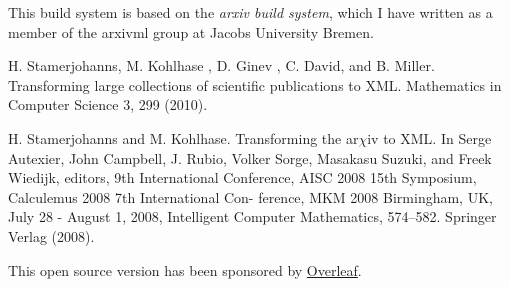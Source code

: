 \documentclass[a4paper]{article}
\begin{document}
This build system is based on the \textit{arxiv build system}, which I have written
as a member of the arxivml group at Jacobs University Bremen.

H. Stamerjohanns, M. Kohlhase , D. Ginev , C. David, and B. Miller. Transforming large collections of scientific publications to XML. Mathematics in Computer Science 3, 299 (2010).

H. Stamerjohanns and M. Kohlhase. Transforming the ar$\chi$iv to XML.
In Serge Autexier, John Campbell, J. Rubio, Volker Sorge, Masakasu
Suzuki, and Freek Wiedijk, editors, 9th International Conference,
AISC 2008 15th Symposium, Calculemus 2008 7th International Con-
ference, MKM 2008 Birmingham, UK, July 28 - August 1, 2008, Intelligent Computer Mathematics, 574–582. Springer Verlag (2008).

This open source version has been sponsored by 
\href{https://www.overleaf.com}{Overleaf}.
\end{document}
